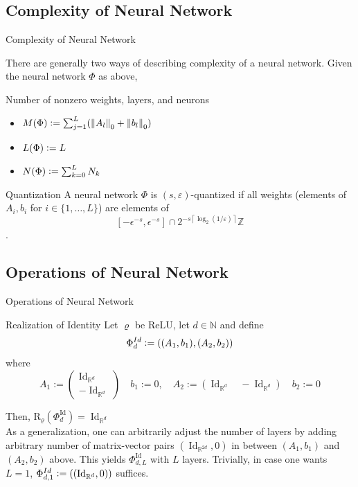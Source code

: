 \documentclass{if-beamer}
\newcommand{\defeq}{\vcentcolon=}
\newcommand{\norm}[2]{\left\lVert#1\right\rVert_{#2}}
\begin{document}
\subsection{Complexity of Neural Network}

\begin{frame}{Complexity of Neural Network}

\vskip 0.5cm
There are generally two ways of describing complexity of a neural network. Given the neural network $\Phi$ as above,
\begin{block}{Number of nonzero weights, layers, and neurons}
\begin{itemize}
    \item $M(\Phi) \defeq \sum_{j=1}^L (\norm{A_l}{0} + \norm{b_l}{0})$
    \item $L(\Phi) \defeq L$
    \item $N(\Phi) \defeq \sum_{k=0}^L N_k$
\end{itemize}

\end{block}

\begin{block}{Quantization}
A neural network $\Phi$ is $(s,\varepsilon)$-quantized if all weights (elements of $A_i, b_i$ for $i\in\{1,\dots,L\}$) are elements of $$[-\epsilon^{-s}, \epsilon^{-s}] \cap 2^{-s\left\lceil\log _{2}(1 / \varepsilon)\right\rceil} \mathbb{Z}$$.
\end{block}
\end{frame}

\subsection{Operations of Neural Network}
\begin{frame}{Operations of Neural Network}
    \begin{block}{Realization of Identity}
        Let $\varrho$ be ReLU, let $d \in \mathbb{N}$ and define $$\Phi_d^{Id} \defeq \left((A_1,b_1),(A_2,b_2) \right) $$
        where 
        $$A_{1}:=\left(
        \begin{array}{c}
            \operatorname{Id}_{\mathbb{R}^{d}} \\
            -\operatorname{Id}_{\mathbb{R}^{d}}
        \end{array}
        \right) \quad b_{1}:=0, 
        \quad A_{2}:=\left(\operatorname{Id}_{\mathbb{R}^{d}} \quad-\operatorname{Id}_{\mathbb{R}^{d}}\right) \quad b_{2}:=0
        $$
    \end{block}
    Then, $\mathrm{R}_{\varrho}(\Phi_{d}^{\operatorname{Id}}) = \operatorname{Id}_{\mathbb{R}^d}$\\
    \medskip
    As a generalization, one can arbitrarily adjust the number of layers by adding arbitrary number of matrix-vector pairs $(\operatorname{Id}_{\mathbb{R}^{2d}}, 0)$ in between $(A_1,b_1)$ and $(A_2,b_2)$ above. This yields $\Phi_{d,L}^{\operatorname{Id}}$ with $L$ layers. Trivially, in case one wants $L=1$, $\Phi_{d,1}^{Id} \defeq \left((\operatorname{Id}_{\mathbb{R}^d}, 0) \right)$ suffices.
\end{frame}
\end{document}
